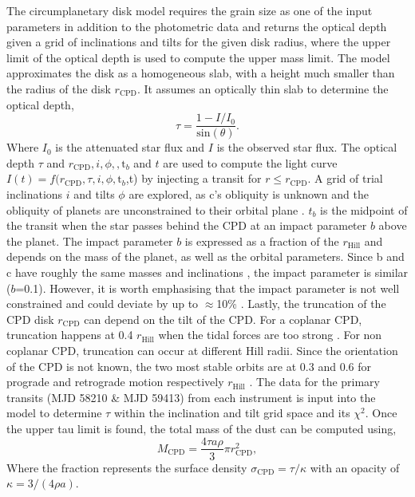 The circumplanetary disk model requires the grain size as one of the input parameters in addition to the photometric data and returns the optical depth given a grid of inclinations and tilts for the given disk radius, where the upper limit of the optical depth is used to compute the upper mass limit. 
%
The model approximates the disk as a homogeneous slab, with a height much smaller than the radius of the disk $r_{\text{CPD}}$. 
%
It assumes an optically thin slab to determine the optical depth,
%
\begin{equation} 
\tau = \frac{1-I/I_0}{\text{sin}(\theta)}.
\end{equation} 
%
Where $I_0$ is the attenuated star flux and $I$ is the observed star flux. 
%
The optical depth $\tau$ and $r_{\text{CPD}},i,\phi,,\text{t}_b$ and $t$ are used to compute the light curve  $I(t)=f(r_{\text{CPD}},\tau,i,\phi,\text{t}_b$,t) by injecting a transit for $r \leq r_{\text{CPD}}$. 
%
A grid of trial inclinations $i$ and tilts $\phi$ are explored, as  \pic c's obliquity is unknown and the obliquity of planets are unconstrained to their orbital plane \citep{Laskar_1993, Kenworthy_2021}.  
%
$t_b$ is the midpoint of the transit when the star passes behind the CPD at an impact parameter $b$ above the planet.
%
The impact parameter $b$ is expressed as a fraction of the $r_{\text{Hill}}$ and depends on the mass of the planet, as well as the orbital parameters.  
%
Since \pic b and c have roughly the same masses and inclinations \citep{Kenworthy_2021}, the impact parameter is similar ($b$=0.1).  
%
However, it is worth emphasising that the impact parameter is not well constrained and could deviate by up to $\approx$10\% \citep[e.g.][]{Wang_2016,Lagrange_2019,Nielsen_2020}.  
%
Lastly, the truncation of the CPD disk $r_{\text{CPD}}$ can depend on the tilt of the CPD.
%
For a coplanar CPD, truncation happens at 0.4 $r_{\text{Hill}}$ when the tidal forces are too strong \citep{Martin_2011}.  
%
For non coplanar CPD, truncation can occur at different Hill radii.  
%
Since the orientation of the CPD is not known, the two most stable orbits are at 0.3 and 0.6  for prograde and retrograde motion respectively $r_{\text{Hill}}$ \citep{Lubow_2015, Miranda_2015}. 
%
The data for the primary transits (MJD 58210 \& MJD 59413)  from each instrument is input into the model to determine $\tau$ within the inclination and tilt grid space and its $\chi^2$. 
%
Once the upper tau limit is found, the total mass of the dust can be computed using, 
%
\begin{equation}
    M_{\text{CPD}} = \frac{4 \tau a \rho}{3} \pi r_{\text{CPD}}^2,
    \label{eq:mass_limit}
\end{equation} 
%
Where the fraction represents the surface density $\sigma_{\text{CPD}} = \tau / \kappa$ with an opacity of $\kappa = 3/(4 \rho a)$.  

